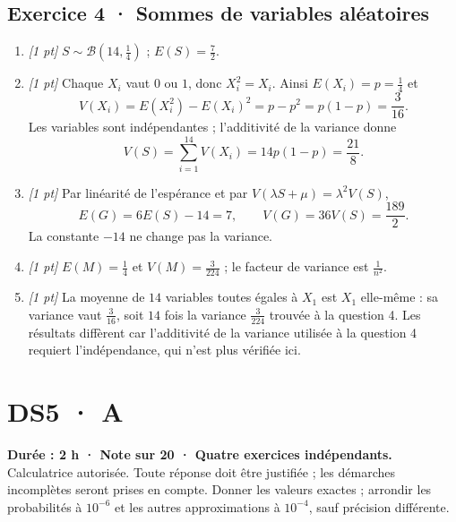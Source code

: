 \subsection*{Exercice 4 · Sommes de variables aléatoires}\begin{enumerate}

\item \textit{[1 pt]} $S\sim\mathcal B(14,\frac{1}{4})$ ; $E(S)=\frac{7}{2}$.

\item \textit{[1 pt]} Chaque $X_i$ vaut $0$ ou $1$, donc $X_i^2=X_i$. Ainsi $E(X_i)=p=\frac{1}{4}$ et
\[V(X_i)=E(X_i^2)-E(X_i)^2=p-p^2=p(1-p)=\frac{3}{16}.\]
Les variables sont indépendantes ; l'additivité de la variance donne
\[V(S)=\sum_{i=1}^{14}V(X_i)=14p(1-p)=\frac{21}{8}.\]

\item \textit{[1 pt]} Par linéarité de l'espérance et par $V(\lambda S+\mu)=\lambda^2V(S)$,
\[E(G)=6E(S)-14=7,\qquad V(G)=36V(S)=\frac{189}{2}.\]
La constante $-14$ ne change pas la variance.

\item \textit{[1 pt]} $E(M)=\frac{1}{4}$ et $V(M)=\frac{3}{224}$ ; le facteur de variance est $\frac{1}{n^2}$.

\item \textit{[1 pt]} La moyenne de $14$ variables toutes égales à $X_1$ est $X_1$ elle-même : sa variance vaut $\frac{3}{16}$, soit $14$ fois la variance $\frac{3}{224}$ trouvée à la question 4. Les résultats diffèrent car l'additivité de la variance utilisée à la question 4 requiert l'indépendance, qui n'est plus vérifiée ici.

\end{enumerate}

\fi

\ifmxteacher

\mxnewpage{}\label{sujet:7-3}

\section*{DS5 · A}


\textbf{Durée : 2 h · Note sur 20 · Quatre exercices indépendants.}\\Calculatrice autorisée. Toute réponse doit être justifiée ; les démarches incomplètes seront prises en compte. Donner les valeurs exactes ; arrondir les probabilités à $10^{-6}$ et les autres approximations à $10^{-4}$, sauf précision différente.

